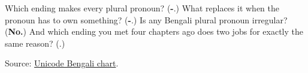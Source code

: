 \begin{tcolorbox}[breakable,colback=teal!4,colframe=teal!35!black,title={Before you move on}]
Which ending makes every plural pronoun? (\textbf{-}.) What replaces it when the pronoun has to own something? (\textbf{-}.) Is any Bengali plural pronoun irregular? (\textbf{No.}) And which ending you met four chapters ago does two jobs for exactly the same reason? (\textbf{}.)

Source: \href{https://www.unicode.org/charts/PDF/U0980.pdf}{Unicode Bengali chart}.
\end{tcolorbox}
